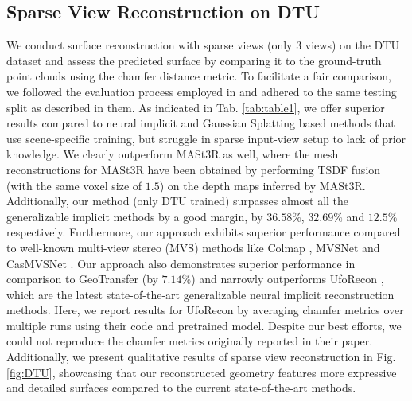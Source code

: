 \subsection{Sparse View Reconstruction on DTU}
\vspace{-5pt}
We conduct surface reconstruction with sparse views (only $3$ views) on the DTU dataset \cite{aanaes2016large} and assess the predicted surface by comparing it to the ground-truth point clouds using the chamfer distance metric. To facilitate a fair comparison, we followed the evaluation process employed in \cite{long2022sparseneus, ren2023volrecon, liang2024retr, jena2024geotransfer, na2024uforecon} and adhered to the same testing split as described in them. As indicated in Tab. \ref{tab:table1}, we offer superior results compared to neural implicit \cite{yariv2021volume, wang2021neus} and Gaussian Splatting based \cite{kerbl20233d, huang20242d} methods that use scene-specific training, but struggle in sparse input-view setup to lack of prior knowledge. We clearly outperform MASt3R \cite{leroy2024grounding} as well, where the mesh reconstructions for MASt3R have been obtained by performing TSDF fusion (with the same voxel size of $1.5$) on the depth maps inferred by MASt3R. Additionally, our method (only DTU trained) surpasses almost all the generalizable implicit methods \cite{long2022sparseneus, ren2023volrecon, liang2024retr} by a good margin, \ie by $36.58\%$, $32.69\%$ and $12.5\%$ respectively. Furthermore, our approach exhibits superior performance compared to well-known multi-view stereo (MVS) methods like Colmap \cite{schonberger2016structure}, MVSNet \cite{yao2018mvsnet} and CasMVSNet \cite{gu2020cascade}. Our approach also demonstrates superior performance in comparison to GeoTransfer \cite{jena2024geotransfer} (by $7.14\%$) and narrowly outperforms UfoRecon \cite{na2024uforecon}, which are the latest state-of-the-art generalizable neural implicit reconstruction methods. Here, we report results for UfoRecon \cite{na2024uforecon} by averaging chamfer metrics over multiple runs using their code and pretrained model\footnotemark[1]. Despite our best efforts, we could not reproduce the chamfer metrics originally reported in their paper. Additionally, we present qualitative results of sparse view reconstruction in Fig.\ref{fig:DTU}, showcasing that our reconstructed geometry features more expressive and detailed surfaces compared to the current state-of-the-art methods.

